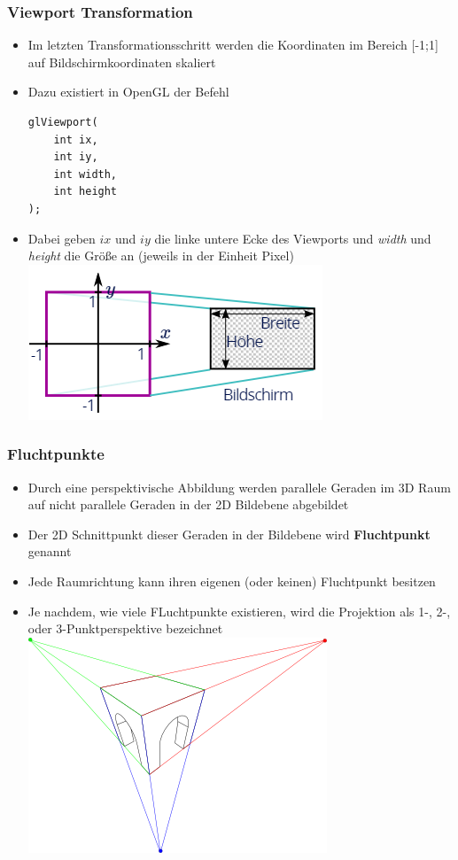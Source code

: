 \documentclass{scrartcl}
\begin{document}
\subsubsection{Viewport Transformation}

\begin{itemize}
	\item Im letzten Transformationsschritt werden die Koordinaten im Bereich [-1;1] auf Bildschirmkoordinaten skaliert
	\item Dazu existiert in OpenGL der Befehl \\
	\begin{lstlisting}
glViewport(
	int ix,
	int iy,
	int width,
	int height
);
	\end{lstlisting}
	\item Dabei geben $ix$ und $iy$ die linke untere Ecke des Viewports und \textit{width} und \textit{height} die Größe an (jeweils in der Einheit Pixel) \\
	\includegraphics[scale=0.5]{figures/viewport_transformation.png}
\end{itemize}

\subsubsection{Fluchtpunkte}

\begin{itemize}
 \item Durch eine perspektivische Abbildung werden parallele Geraden im 3D Raum auf nicht parallele Geraden in der 2D Bildebene abgebildet
 \item Der 2D Schnittpunkt dieser Geraden in der Bildebene wird \textbf{Fluchtpunkt} genannt
 \item Jede Raumrichtung kann ihren eigenen (oder keinen) Fluchtpunkt besitzen
 \item Je nachdem, wie viele FLuchtpunkte existieren, wird die Projektion als 1-, 2-, oder 3-Punktperspektive bezeichnet \\
 \includegraphics[scale=0.5]{figures/vanishing_points.png}
\end{itemize}
\end{document}
